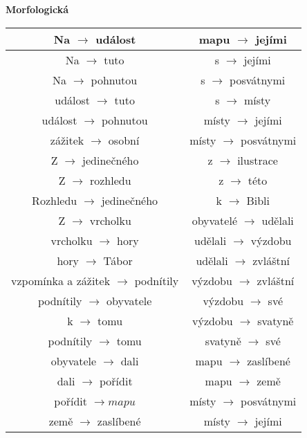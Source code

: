\documentclass[12pt,a4paper]{article}
\theoremstyle{definition}
\begin{document}
\textbf{Morfologick\'{a}} \\
\begin{tabular}{|c||c|}
\hline
Na  $ \rightarrow $ ud\'{a}lost &  mapu $ \rightarrow  $ jej\'{i}mi \\
\hline 
Na  $ \rightarrow $ tuto  & s $ \rightarrow  $ jej\'{i}mi  \\
\hline 
Na  $ \rightarrow $ pohnutou &  s $ \rightarrow  $ posv\'{a}tnymi\\
\hline 
ud\'{a}lost  $ \rightarrow $ tuto & s $ \rightarrow  $ m\'{i}sty \\
\hline 
ud\'{a}lost  $ \rightarrow $ pohnutou & m\'{i}sty $ \rightarrow  $ jej\'{i}mi  \\
\hline
z\'{a}\v{z}itek $ \rightarrow $ osobn\'{i} & m\'{i}sty $ \rightarrow  $ posv\'{a}tnymi \\
\hline
Z  $ \rightarrow $ jedine\v{c}n\'{e}ho & z $ \rightarrow  $ ilustrace \\
\hline
Z  $ \rightarrow $ rozhledu & z $ \rightarrow  $ t\'{e}to \\
\hline 
Rozhledu  $ \rightarrow $ jedine\v{c}n\'{e}ho & k $ \rightarrow  $ Bibli \\
\hline
Z  $ \rightarrow $ vrcholku &  obyvatel\'{e} $ \rightarrow  $ ud\v{e}lali  \\
\hline
vrcholku  $ \rightarrow $ hory & ud\v{e}lali $ \rightarrow  $ v\'{y}zdobu \\
\hline
hory  $ \rightarrow $ T\'{a}bor & ud\v{e}lali $ \rightarrow  $ zvl\'{a}\v{s}tn\'{i} \\
\hline
vzpom\'{i}nka a z\'{a}\v{z}itek $ \rightarrow $ podn\'{i}tily & v\'{y}zdobu $ \rightarrow  $ zvl\'{a}\v{s}tn\'{i} \\
\hline
podn\'{i}tily  $ \rightarrow $ obyvatele &  v\'{y}zdobu $ \rightarrow  $ sv\'{e} \\
\hline
k  $ \rightarrow $ tomu & v\'{y}zdobu $ \rightarrow  $ svatyn\v{e}  \\
\hline
podn\'{i}tily  $ \rightarrow $ tomu & svatyn\v{e} $ \rightarrow  $ sv\'{e}  \\
\hline
obyvatele $ \rightarrow $ dali & mapu $ \rightarrow  $ zasl\'{i}ben\'{e} \\
\hline
dali $ \rightarrow $ po\v{r}\'{i}dit & mapu $ \rightarrow  $ zem\v{e} \\
\hline
po\v{r}\'{i}dit $ \rightarrow mapu $ & m\'{i}sty $ \rightarrow  $ posv\'{a}tnymi  \\
\hline
zem\v{e} $ \rightarrow  $ zasl\'{i}ben\'{e} & m\'{i}sty $ \rightarrow  $ jej\'{i}mi  \\
\hline

\end{tabular}
\end{document}
